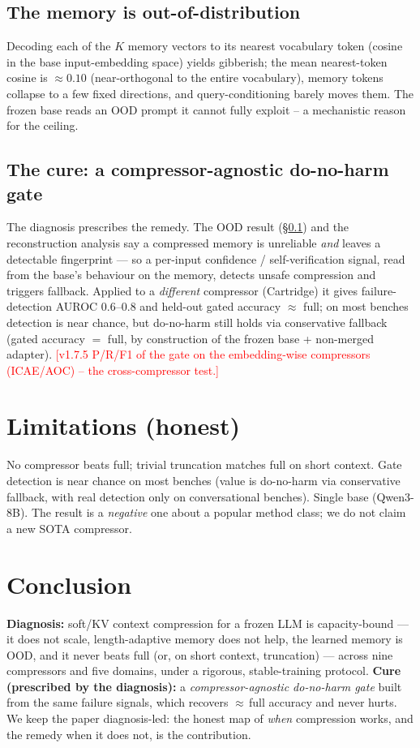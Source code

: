 \documentclass[11pt]{article}
\newcommand{\TODO}[1]{\textcolor{red}{[#1]}}
\begin{document}
\subsection{The memory is out-of-distribution}\label{sec:ood}
Decoding each of the $K$ memory vectors to its nearest vocabulary token (cosine in the base input-embedding
space) yields gibberish; the mean nearest-token cosine is $\approx0.10$ (near-orthogonal to the entire
vocabulary), memory tokens collapse to a few fixed directions, and query-conditioning barely moves them. The
frozen base reads an OOD prompt it cannot fully exploit -- a mechanistic reason for the ceiling.

\subsection{The cure: a compressor-agnostic do-no-harm gate}\label{sec:gate}
The diagnosis prescribes the remedy. The OOD result (\S\ref{sec:ood}) and the reconstruction analysis say a
compressed memory is unreliable \emph{and} leaves a detectable fingerprint --- so a per-input confidence /
self-verification signal, read from the base's behaviour on the memory, detects unsafe compression and triggers
fallback. Applied to a \emph{different} compressor (Cartridge) it gives failure-detection AUROC $0.6$--$0.8$
and held-out gated accuracy $\approx$ full; on most benches detection is near chance, but do-no-harm still holds
via conservative fallback (gated accuracy $=$ full, by construction of the frozen base + non-merged adapter).
\TODO{v1.7.5 P/R/F1 of the gate on the embedding-wise compressors (ICAE/AOC) -- the cross-compressor test.}

\section{Limitations (honest)}
No compressor beats full; trivial truncation matches full on short context. Gate detection is near chance on
most benches (value is do-no-harm via conservative fallback, with real detection only on conversational
benches). Single base (Qwen3-8B). The result is a \emph{negative} one about a popular method class; we do not
claim a new SOTA compressor.

\section{Conclusion}
\textbf{Diagnosis:} soft/KV context compression for a frozen LLM is capacity-bound --- it does not scale,
length-adaptive memory does not help, the learned memory is OOD, and it never beats full (or, on short context,
truncation) --- across nine compressors and five domains, under a rigorous, stable-training protocol.
\textbf{Cure (prescribed by the diagnosis):} a \emph{compressor-agnostic do-no-harm gate} built from the same
failure signals, which recovers $\approx$\,full accuracy and never hurts. We keep the paper diagnosis-led: the
honest map of \emph{when} compression works, and the remedy when it does not, is the contribution.
\end{document}
